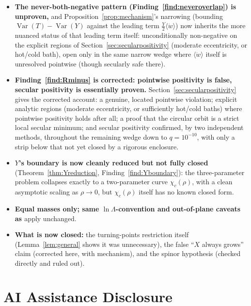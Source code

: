 \documentclass[12pt]{amsart}
\theoremstyle{plain}
\theoremstyle{remark}
\begin{document}
\begin{itemize}
\item[--] \textbf{The never-both-negative pattern (Finding~\ref{find:neveroverlap}) is unproven,} and Proposition~\ref{prop:mechanism}'s narrowing (bounding $\operatorname{Var}(T)-\operatorname{Var}(Y)$ against the leading term $\tfrac{Y}{2}\langle\dot w\rangle$) now inherits the more nuanced status of that leading term itself: unconditionally non-negative on the explicit regions of Section~\ref{sec:secularpositivity} (moderate eccentricity, or hot/cold bath), open only in the same narrow wedge where $\langle\dot w\rangle$ itself is unresolved pointwise (though secularly safe there).
\item[--] \textbf{Finding~\ref{find:Rminus} is corrected: pointwise positivity is false, secular positivity is essentially proven.} Section~\ref{sec:secularpositivity} gives the corrected account: a genuine, located pointwise violation; explicit analytic regions (moderate eccentricity, or sufficiently hot/cold baths) where pointwise positivity holds after all; a proof that the circular orbit is a strict local secular minimum; and secular positivity confirmed, by two independent methods, throughout the remaining wedge down to $q=10^{-10}$, with only a strip below that not yet closed by a rigorous enclosure.
\item[--] \textbf{$Y$'s boundary is now cleanly reduced but not fully closed} (Theorem~\ref{thm:Yreduction}, Finding~\ref{find:Yboundary}): the three-parameter problem collapses exactly to a two-parameter curve $\chi_c(\rho)$, with a clean asymptotic scaling as $\rho\to0$, but $\chi_c(\rho)$ itself has no known closed form.
\item[--] \textbf{Equal masses only; same $\ln\Lambda$-convention and out-of-plane caveats as \cite{Ebert2026Rosenbluth,Ebert2026Cancellation}} apply unchanged.
\item[--] \textbf{What is now closed:} the turning-points restriction itself (Lemma~\ref{lem:general} shows it was unnecessary), the false ``$X$ always grows'' claim (corrected here, with mechanism), and the spinor hypothesis (checked directly and ruled out).
\end{itemize}

\section*{AI Assistance Disclosure}
\end{document}
